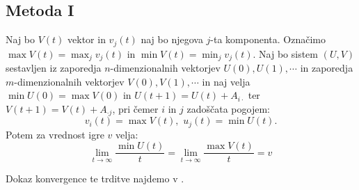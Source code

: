 \documentclass[a4paper,12pt]{article}
\begin{document}
\subsection{Metoda I}
Naj bo $V(t)$ vektor in $v_j(t)$ naj bo njegova $j$-ta komponenta. Označimo $\max V(t) = \max_j v_j(t)$ in $\min V(t) = \min_j v_j(t) $. Naj bo sistem $(U, V)$ sestavljen iz zaporedja $n$-dimenzionalnih vektorjev
$U(0), U(1), \cdots $ in zaporedja $m$-dimenzionalnih vektorjev $V(0), V(1), \cdots$ in naj velja $\min U(0) = \max V(0)$ in $U(t + 1) = U(t) + A_{i \cdot}$ ter $V(t+1) = V(t) + A_{\cdot j}$, pri čemer $i$ in $j$ zadoščata pogojem:
\begin{equation*}
    v_i(t) = \max V(t), \, \,  u_j(t) = \min U(t).
\end{equation*}
Potem za vrednost igre $v$ velja:
\begin{equation*}
\lim_{t \to \infty} \frac{\min U(t)}{t} = \lim_{t \to \infty} \frac{\max V(t)}{t} = v
\end{equation*}

Dokaz konvergence te trditve najdemo v \cite{vir1}.
\end{document}
